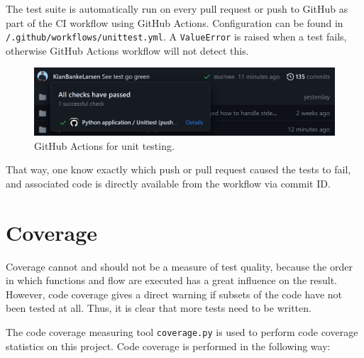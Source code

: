 The test suite is automatically run on every pull request or push to GitHub as part of the CI workflow using GitHub Actions. Configuration can be found in \texttt{/.github/workflows/unittest.yml}. A \texttt{ValueError} is raised when a test fails, otherwise GitHub Actions workflow will not detect this.
\begin{figure}[H]
    \centering
    \includegraphics[width=1\textwidth]{misc/images/GitHub_Actions.png}
    \caption{GitHub Actions for unit testing.}
\end{figure}
That way, one know exactly which push or pull request caused the tests to fail, and associated code is directly available from the workflow via commit ID.

\section{Coverage}
Coverage cannot and should not be a measure of test quality, because the order in which functions and flow are executed has a great influence on the result. However, code coverage gives a direct warning if subsets of the code have not been tested at all. Thus, it is clear that more tests need to be written.

The code coverage measuring tool \texttt{coverage.py} is used to perform code coverage statistics on this project. Code coverage is performed in the following way:

